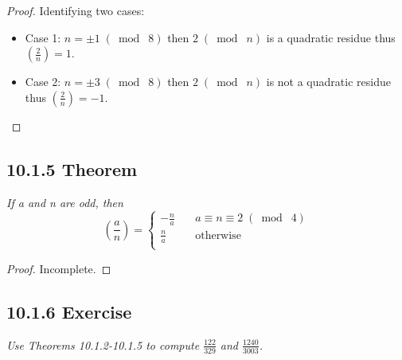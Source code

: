 \documentclass{article}
\begin{document}
\begin{proof}
Identifying two cases:
\begin{itemize}
    \item Case 1: $n = \pm 1 \;(\bmod\; 8)$ then $2 \;(\bmod\; n)$ is a quadratic residue thus $(\frac{2}{n}) = 1$.
    \item Case 2: $n = \pm 3 \;(\bmod\; 8)$ then $2 \;(\bmod\; n)$ is not a quadratic residue thus $(\frac{2}{n}) = -1$.
\end{itemize}
\end{proof}

\subsection*{10.1.5 Theorem} 
\quad \textit{If a and n are odd, then}
\begin{equation*}
(\frac{a}{n}) = \left\{
        \begin{array}{ll}
            -\frac{n}{a} & \quad a \equiv n \equiv 2 \;(\bmod\; 4)\\
            \frac{n}{a} & \quad \text{otherwise}\\
        \end{array}
    \right.
\end{equation*}

\begin{proof}
Incomplete.
\end{proof}

\subsection*{10.1.6 Exercise} 
\quad \textit{Use Theorems 10.1.2-10.1.5 to compute $\frac{122}{329}$ and $\frac{1240}{3003}$.}
\end{document}
